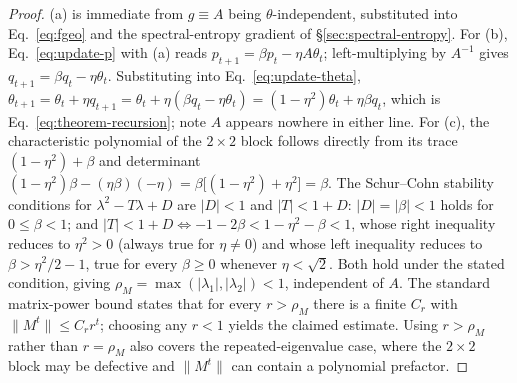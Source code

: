 \documentclass[10pt,twocolumn]{article}
\begin{document}
\begin{proof}
(a) is immediate from $g\equiv A$ being $\theta$-independent, substituted into
Eq.~\eqref{eq:fgeo} and the spectral-entropy gradient of \S\ref{sec:spectral-entropy}.
For (b), Eq.~\eqref{eq:update-p} with (a) reads $p_{t+1}=\beta p_t - \eta A\theta_t$;
left-multiplying by $A^{-1}$ gives $q_{t+1}=\beta q_t - \eta\theta_t$. Substituting
into Eq.~\eqref{eq:update-theta}, $\theta_{t+1}=\theta_t+\eta q_{t+1}
=\theta_t+\eta(\beta q_t-\eta\theta_t)=(1-\eta^2)\theta_t+\eta\beta q_t$, which
is Eq.~\eqref{eq:theorem-recursion}; note $A$ appears nowhere in either line.
For (c), the characteristic polynomial of the $2\times2$ block follows
directly from its trace $(1-\eta^2)+\beta$ and determinant
$(1-\eta^2)\beta-(\eta\beta)(-\eta)=\beta\big[(1-\eta^2)+\eta^2\big]=\beta$.
The Schur--Cohn stability conditions for $\lambda^2-T\lambda+D$ are $|D|<1$
and $|T|<1+D$: $|D|=|\beta|<1$ holds for $0\le\beta<1$; and
$|T|<1+D \Leftrightarrow -1-2\beta < 1-\eta^2-\beta < 1$, whose right
inequality reduces to $\eta^2>0$ (always true for $\eta\ne0$) and whose left
inequality reduces to $\beta > \eta^2/2-1$, true for every $\beta\ge0$
whenever $\eta<\sqrt2$. Both hold under the stated condition, giving
$\rho_M=\max(|\lambda_1|,|\lambda_2|)<1$, independent of $A$.
The standard matrix-power bound states that for every $r>\rho_M$ there is
a finite $C_r$ with $\|M^t\|\le C_r r^t$; choosing any $r<1$ yields the
claimed estimate. Using $r>\rho_M$ rather than $r=\rho_M$ also covers the
repeated-eigenvalue case, where the $2\times2$ block may be defective and
$\|M^t\|$ can contain a polynomial prefactor.
\end{proof}
\end{document}
